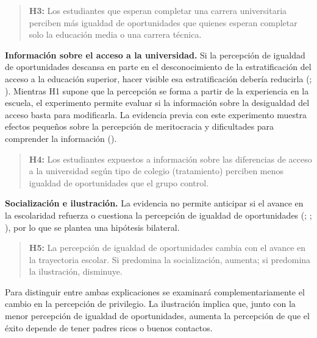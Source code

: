 \documentclass[
  spanish,
  a4paper,
  oneside]{scrbook}
\begin{document}
\begin{quote}
\textbf{H3:} Los estudiantes que esperan completar una carrera
universitaria perciben más igualdad de oportunidades que quienes esperan
completar solo la educación media o una carrera técnica.
\end{quote}

\textbf{Información sobre el acceso a la universidad.} Si la percepción
de igualdad de oportunidades descansa en parte en el desconocimiento de
la estratificación del acceso a la educación superior, hacer visible esa
estratificación debería reducirla
(;
). Mientras H1
supone que la percepción se forma a partir de la experiencia en la
escuela, el experimento permite evaluar si la información sobre la
desigualdad del acceso basta para modificarla. La evidencia previa con
este experimento muestra efectos pequeños sobre la percepción de
meritocracia y dificultades para comprender la información
().

\begin{quote}
\textbf{H4:} Los estudiantes expuestos a información sobre las
diferencias de acceso a la universidad según tipo de colegio
(tratamiento) perciben menos igualdad de oportunidades que el grupo
control.
\end{quote}

\textbf{Socialización e ilustración.} La evidencia no permite anticipar
si el avance en la escolaridad refuerza o cuestiona la percepción de
igualdad de oportunidades (; ; ),
por lo que se plantea una hipótesis bilateral.

\begin{quote}
\textbf{H5:} La percepción de igualdad de oportunidades cambia con el
avance en la trayectoria escolar. Si predomina la socialización,
aumenta; si predomina la ilustración, disminuye.
\end{quote}

Para distinguir entre ambas explicaciones se examinará
complementariamente el cambio en la percepción de privilegio. La
ilustración implica que, junto con la menor percepción de igualdad de
oportunidades, aumenta la percepción de que el éxito depende de tener
padres ricos o buenos contactos.
\end{document}

